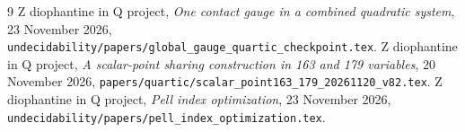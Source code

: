 \documentclass[11pt]{article}
\theoremstyle{remark}\newtheorem{remark}[theorem]{Remark}
\begin{document}
\begin{thebibliography}{9}
Z diophantine in Q project,
\emph{One contact gauge in a combined quadratic system},
23 November 2026,
\nolinkurl{undecidability/papers/global_gauge_quartic_checkpoint.tex}.
Z diophantine in Q project,
\emph{A scalar-point sharing construction in 163 and 179 variables},
20 November 2026,
\nolinkurl{papers/quartic/scalar_point163_179_20261120_v82.tex}.
Z diophantine in Q project,
\emph{Pell index optimization}, 23 November 2026,
\nolinkurl{undecidability/papers/pell_index_optimization.tex}.
\end{thebibliography}
\end{document}
